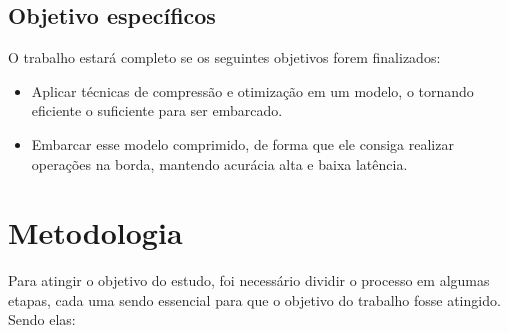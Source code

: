 \subsection{Objetivo específicos}
O trabalho estará completo se os seguintes objetivos forem finalizados:

\begin{itemize}
	\item Aplicar técnicas de compressão e otimização em um modelo, o tornando eficiente o suficiente para ser
		embarcado.
	\item Embarcar esse modelo comprimido, de forma que ele consiga realizar operações na borda, mantendo acurácia
		alta e baixa latência.
\end{itemize}

\section{Metodologia}
Para atingir o objetivo do estudo, foi necessário dividir o processo em algumas etapas, cada uma sendo
essencial para que o objetivo do trabalho fosse atingido. Sendo elas:

